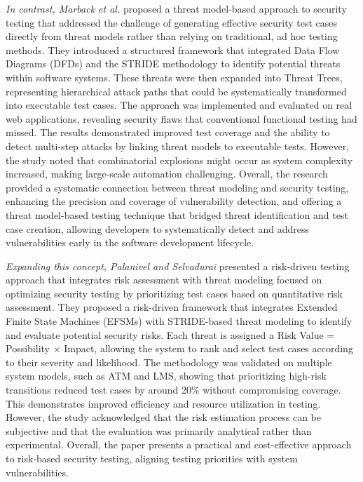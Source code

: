 \textit{In contrast, Marback et al.} proposed a threat model-based approach to security testing that addressed the challenge of generating effective security test cases directly from threat models rather than relying on traditional, ad hoc testing methods. They introduced a structured framework that integrated Data Flow Diagrams (DFDs) and the STRIDE methodology to identify potential threats within software systems. These threats were then expanded into Threat Trees, representing hierarchical attack paths that could be systematically transformed into executable test cases. The approach was implemented and evaluated on real web applications, revealing security flaws that conventional functional testing had missed. The results demonstrated improved test coverage and the ability to detect multi-step attacks by linking threat models to executable tests. However, the study noted that combinatorial explosions might occur as system complexity increased, making large-scale automation challenging. Overall, the research provided a systematic connection between threat modeling and security testing, enhancing the precision and coverage of vulnerability detection, and offering a threat model-based testing technique that bridged threat identification and test case creation, allowing developers to systematically detect and address vulnerabilities early in the software development lifecycle. \cite{marback2013}

\textit{Expanding this concept, Palanivel and Selvadurai} presented a risk-driven testing approach that integrates risk assessment with threat modeling focused on optimizing security testing by prioritizing test cases based on quantitative risk assessment. They proposed a risk-driven framework that integrates Extended Finite State Machines (EFSMs) with STRIDE-based threat modeling to identify and evaluate potential security risks. Each threat is assigned a Risk Value = Possibility $\times$ Impact, allowing the system to rank and select test cases according to their severity and likelihood. The methodology was validated on multiple system models, such as ATM and LMS, showing that prioritizing high-risk transitions reduced test cases by around 20\% without compromising coverage. This demonstrates improved efficiency and resource utilization in testing. However, the study acknowledged that the risk estimation process can be subjective and that the evaluation was primarily analytical rather than experimental. Overall, the paper presents a practical and cost-effective approach to risk-based security testing, aligning testing priorities with system vulnerabilities. \cite{palanivel2014}

